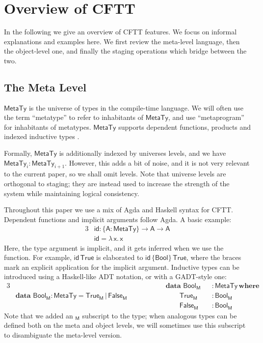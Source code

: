 \documentclass[acmsmall,screen,review,anonymous]{acmart}
\newcommand{\mit}[1]{{\mathsf{#1}}}
\newcommand{\msf}[1]{{\mathsf{#1}}}
\newcommand{\mbf}[1]{{\mathbf{#1}}}
\newcommand{\bs}[1]{\boldsymbol{#1}}
\newcommand{\ind}{\hspace{1em}}
\newcommand{\lam}{\lambda\,}
\newcommand{\data}{\mbf{data}\,}
\newcommand{\where}{\mbf{where}}
\newcommand{\M}{\msf{M}}
\newcommand{\vA}{\mathsf{A}}
\newcommand{\vx}{\mathsf{x}}
\newcommand{\Bool}{\msf{Bool}}
\newcommand{\MTy}{\msf{MetaTy}}
\newcommand{\True}{\msf{True}}
\newcommand{\False}{\msf{False}}
\theoremstyle{remark}
\newcommand{\id}{\mit{id}}
\begin{document}
\section{Overview of CFTT}\label{sec:overview-of-cftt}

In the following we give an overview of CFTT features. We focus on informal
explanations and examples here. We first review the meta-level language, then
the object-level one, and finally the staging operations which bridge between
the two.

\subsection{The Meta Level}\label{sec:the-meta-level}

$\bs{\MTy}$ is the universe of types in the compile-time language. We will often
use the term ``metatype'' to refer to inhabitants of $\MTy$, and use
``metaprogram'' for inhabitants of metatypes. $\MTy$ supports dependent
functions, products and indexed inductive types \cite{TODO}.

Formally, $\MTy$ is additionally indexed by universes levels, and we have
$\MTy_i : \MTy_{i+1}$. However, this adds a bit of noise, and it is not very
relevant to the current paper, so we shall omit levels. Note that universe
levels are orthogonal to staging; they are instead used to increase the strength
of the system while maintaining logical consistency.

Throughout this paper we use a mix of Agda and Haskell syntax for
CFTT. Dependent functions and implicit arguments follow Agda. A basic example:
\begin{alignat*}{3}
  &\id : \{\vA : \MTy\} \to \vA \to \vA\\
  &\id = \lam \vx.\, \vx
\end{alignat*}
Here, the type argument is implicit, and it gets inferred when we use the
function. For example, $\id\,\True$ is elaborated to $\id\,\{\Bool\}\,\True$,
where the braces mark an explicit application for the implicit argument.
Inductive types can be introduced using a Haskell-like ADT notation, or with a
GADT-style one:
\begin{alignat*}{3}
  &                                           &&\hspace{4em}\data\,\Bool_\M &&: \MTy\,\where\\
  & \data\,\Bool_\M : \MTy = \True_\M\,|\,\False_\M &&\hspace{4em}\ind\ind \True_\M &&: \Bool_\M\\
  &                                           &&\hspace{4em}\ind\ind \False_\M &&: \Bool_\M
\end{alignat*}
Note that we added an $_\M$ subscript to the type; when analogous types can be
defined both on the meta and object levels, we will sometimes use this subscript
to disambiguate the meta-level version.
\end{document}
